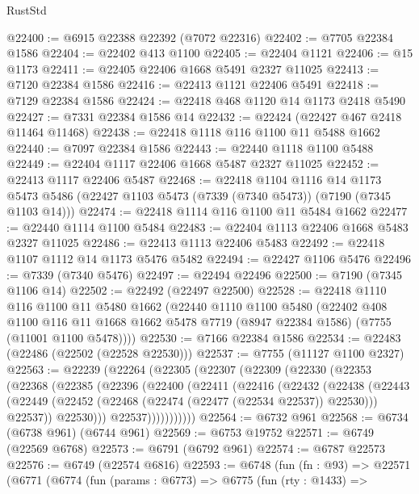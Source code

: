 \begin{lexlean}{RustStd}
\begin{coremodule}
@22400 := @6915 @22388 @22392 (@7072 @22316)
@22402 := @7705 @22384 @1586
@22404 := @22402 @413 @1100
@22405 := @22404 @1121
@22406 := @15 @1173
@22411 := @22405 @22406 @1668 @5491 @2327 @11025
@22413 := @7120 @22384 @1586
@22416 := @22413 @1121 @22406 @5491
@22418 := @7129 @22384 @1586
@22424 := @22418 @468 @1120 @14 @1173 @2418 @5490
@22427 := @7331 @22384 @1586 @14
@22432 := @22424 (@22427 @467 @2418 @11464 @11468)
@22438 := @22418 @1118 @116 @1100 @11 @5488 @1662
@22440 := @7097 @22384 @1586
@22443 := @22440 @1118 @1100 @5488
@22449 := @22404 @1117 @22406 @1668 @5487 @2327 @11025
@22452 := @22413 @1117 @22406 @5487
@22468 := @22418
    @1104
    @1116
    @14
    @1173
    @5473
    @5486
    (@22427 @1103 @5473 (@7339 (@7340 @5473)) (@7190 (@7345 @1103 @14)))
@22474 := @22418 @1114 @116 @1100 @11 @5484 @1662
@22477 := @22440 @1114 @1100 @5484
@22483 := @22404 @1113 @22406 @1668 @5483 @2327 @11025
@22486 := @22413 @1113 @22406 @5483
@22492 := @22418 @1107 @1112 @14 @1173 @5476 @5482
@22494 := @22427 @1106 @5476
@22496 := @7339 (@7340 @5476)
@22497 := @22494 @22496
@22500 := @7190 (@7345 @1106 @14)
@22502 := @22492 (@22497 @22500)
@22528 := @22418
    @1110
    @116
    @1100
    @11
    @5480
    @1662
    (@22440
      @1110
      @1100
      @5480
      (@22402
        @408
        @1100
        @116
        @11
        @1668
        @1662
        @5478
        @7719
        (@8947 @22384 @1586)
        (@7755 (@11001 @1100 @5478))))
@22530 := @7166 @22384 @1586
@22534 := @22483 (@22486 (@22502 (@22528 @22530)))
@22537 := @7755 (@11127 @1100 @2327)
@22563 := @22239
    (@22264
      (@22305
        (@22307
          (@22309
            (@22330
              (@22353
                (@22368
                  (@22385
                    (@22396
                      (@22400
                        (@22411
                          (@22416
                            (@22432
                              (@22438
                                (@22443
                                  (@22449
                                    (@22452 (@22468 (@22474 (@22477 (@22534 @22537)) @22530)))
                                    @22537))
                                @22530)))
                          @22537)))))))))))
@22564 := @6732 @961
@22568 := @6734 (@6738 @961) (@6744 @961)
@22569 := @6753 @19752
@22571 := @6749 (@22569 @6768)
@22573 := @6791 (@6792 @961)
@22574 := @6787 @22573
@22576 := @6749 (@22574 @6816)
@22593 := @6748
    (fun (fn : @93) =>
    @22571
      (@6771
        (@6774
          (fun (params : @6773) =>
          @6775
            (fun (rty : @1433) =>

\end{coremodule}
\end{lexlean}
